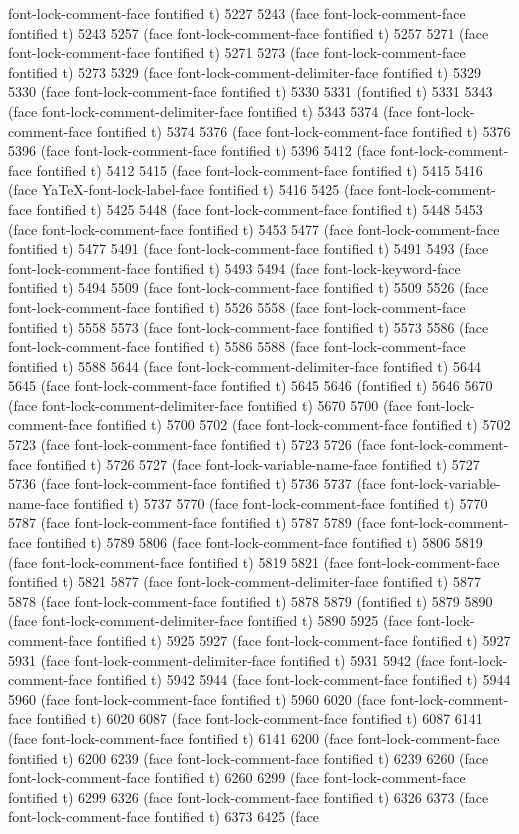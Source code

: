 {font-lock-comment-face fontified t) 5227 5243 (face font-lock-comment-face fontified t) 5243 5257 (face font-lock-comment-face fontified t) 5257 5271 (face font-lock-comment-face fontified t) 5271 5273 (face font-lock-comment-face fontified t) 5273 5329 (face font-lock-comment-delimiter-face fontified t) 5329 5330 (face font-lock-comment-face fontified t) 5330 5331 (fontified t) 5331 5343 (face font-lock-comment-delimiter-face fontified t) 5343 5374 (face font-lock-comment-face fontified t) 5374 5376 (face font-lock-comment-face fontified t) 5376 5396 (face font-lock-comment-face fontified t) 5396 5412 (face font-lock-comment-face fontified t) 5412 5415 (face font-lock-comment-face fontified t) 5415 5416 (face YaTeX-font-lock-label-face fontified t) 5416 5425 (face font-lock-comment-face fontified t) 5425 5448 (face font-lock-comment-face fontified t) 5448 5453 (face font-lock-comment-face fontified t) 5453 5477 (face font-lock-comment-face fontified t) 5477 5491 (face font-lock-comment-face fontified t) 5491 5493 (face font-lock-comment-face fontified t) 5493 5494 (face font-lock-keyword-face fontified t) 5494 5509 (face font-lock-comment-face fontified t) 5509 5526 (face font-lock-comment-face fontified t) 5526 5558 (face font-lock-comment-face fontified t) 5558 5573 (face font-lock-comment-face fontified t) 5573 5586 (face font-lock-comment-face fontified t) 5586 5588 (face font-lock-comment-face fontified t) 5588 5644 (face font-lock-comment-delimiter-face fontified t) 5644 5645 (face font-lock-comment-face fontified t) 5645 5646 (fontified t) 5646 5670 (face font-lock-comment-delimiter-face fontified t) 5670 5700 (face font-lock-comment-face fontified t) 5700 5702 (face font-lock-comment-face fontified t) 5702 5723 (face font-lock-comment-face fontified t) 5723 5726 (face font-lock-comment-face fontified t) 5726 5727 (face font-lock-variable-name-face fontified t) 5727 5736 (face font-lock-comment-face fontified t) 5736 5737 (face font-lock-variable-name-face fontified t) 5737 5770 (face font-lock-comment-face fontified t) 5770 5787 (face font-lock-comment-face fontified t) 5787 5789 (face font-lock-comment-face fontified t) 5789 5806 (face font-lock-comment-face fontified t) 5806 5819 (face font-lock-comment-face fontified t) 5819 5821 (face font-lock-comment-face fontified t) 5821 5877 (face font-lock-comment-delimiter-face fontified t) 5877 5878 (face font-lock-comment-face fontified t) 5878 5879 (fontified t) 5879 5890 (face font-lock-comment-delimiter-face fontified t) 5890 5925 (face font-lock-comment-face fontified t) 5925 5927 (face font-lock-comment-face fontified t) 5927 5931 (face font-lock-comment-delimiter-face fontified t) 5931 5942 (face font-lock-comment-face fontified t) 5942 5944 (face font-lock-comment-face fontified t) 5944 5960 (face font-lock-comment-face fontified t) 5960 6020 (face font-lock-comment-face fontified t) 6020 6087 (face font-lock-comment-face fontified t) 6087 6141 (face font-lock-comment-face fontified t) 6141 6200 (face font-lock-comment-face fontified t) 6200 6239 (face font-lock-comment-face fontified t) 6239 6260 (face font-lock-comment-face fontified t) 6260 6299 (face font-lock-comment-face fontified t) 6299 6326 (face font-lock-comment-face fontified t) 6326 6373 (face font-lock-comment-face fontified t) 6373 6425 (face }
